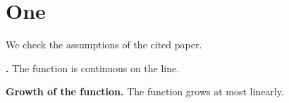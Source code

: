 \documentclass{article}
\begin{document}
\section{One}
We check the assumptions of the cited paper.

{\bf \cite[Assumption 4.1]{key}.} The function is continuous on the line.

{\bf \cite[Assumption 4.2]{key} Growth of the function.} The function grows
at most linearly.
\end{document}
